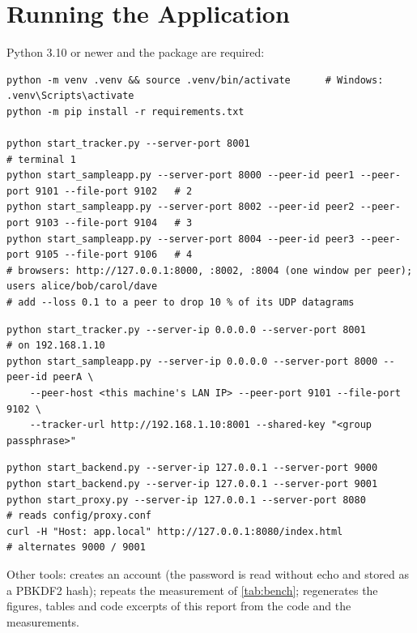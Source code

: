 \section{Running the Application}\label{app:run}
Python 3.10 or newer and the  package are required:

\begin{lstlisting}[style=text, caption={Installation and a three-peer demo on one machine}, label={lst:run}]
python -m venv .venv && source .venv/bin/activate      # Windows: .venv\Scripts\activate
python -m pip install -r requirements.txt

python start_tracker.py --server-port 8001                                        # terminal 1
python start_sampleapp.py --server-port 8000 --peer-id peer1 --peer-port 9101 --file-port 9102   # 2
python start_sampleapp.py --server-port 8002 --peer-id peer2 --peer-port 9103 --file-port 9104   # 3
python start_sampleapp.py --server-port 8004 --peer-id peer3 --peer-port 9105 --file-port 9106   # 4
# browsers: http://127.0.0.1:8000, :8002, :8004 (one window per peer); users alice/bob/carol/dave
# add --loss 0.1 to a peer to drop 10 % of its UDP datagrams
\end{lstlisting}

\begin{lstlisting}[style=text, caption={Several machines on one LAN}, label={lst:run-lan}]
python start_tracker.py --server-ip 0.0.0.0 --server-port 8001                    # on 192.168.1.10
python start_sampleapp.py --server-ip 0.0.0.0 --server-port 8000 --peer-id peerA \
    --peer-host <this machine's LAN IP> --peer-port 9101 --file-port 9102 \
    --tracker-url http://192.168.1.10:8001 --shared-key "<group passphrase>"
\end{lstlisting}

\begin{lstlisting}[style=text, caption={Proxy with two static backends}, label={lst:run-proxy}]
python start_backend.py --server-ip 127.0.0.1 --server-port 9000
python start_backend.py --server-ip 127.0.0.1 --server-port 9001
python start_proxy.py --server-ip 127.0.0.1 --server-port 8080          # reads config/proxy.conf
curl -H "Host: app.local" http://127.0.0.1:8080/index.html            # alternates 9000 / 9001
\end{lstlisting}

Other tools:  creates an account (the password is read
without echo and stored as a PBKDF2 hash);  repeats the measurement
of \cref{tab:bench}; \code{python report/make_figures.py} regenerates the figures, tables and code
excerpts of this report from the code and the measurements.

